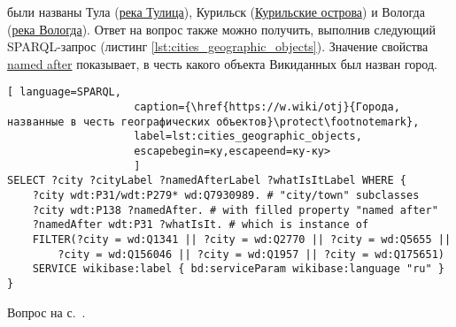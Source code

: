 \begin{task}
    \label{answer:cities_geographic_objects}
     были названы Тула (\href{https://w.wiki/oLJ}{река Тулица}), Курильск (\href{https://w.wiki/oLH}{Курильские острова}) и Вологда (\href{https://w.wiki/oLG}{река Вологда}). Ответ на вопрос также можно получить, выполнив следующий SPARQL-запрос (листинг \ref{lst:cities_geographic_objects}). Значение свойства \href{https://www.wikidata.org/wiki/Property:P138}{named after} показывает, в честь какого объекта Викиданных был назван город.
    
    
    \begin{lstlisting}[ language=SPARQL, 
                    caption={\href{https://w.wiki/otj}{Города, названные в честь географических объектов}\protect\footnotemark},
                    label=lst:cities_geographic_objects, 
                    escapebegin=ку,escapeend=ку-ку>
                    ]
SELECT ?city ?cityLabel ?namedAfterLabel ?whatIsItLabel WHERE {
	?city wdt:P31/wdt:P279* wd:Q7930989. # "city/town" subclasses
	?city wdt:P138 ?namedAfter. # with filled property "named after"
	?namedAfter wdt:P31 ?whatIsIt. # which is instance of
	FILTER(?city = wd:Q1341 || ?city = wd:Q2770 || ?city = wd:Q5655 ||
		?city = wd:Q156046 || ?city = wd:Q1957 || ?city = wd:Q175651)
	SERVICE wikibase:label { bd:serviceParam wikibase:language "ru" }
}
    \end{lstlisting}
    \small{Вопрос на с.~\pageref{lst:population_town}.}
\end{task}

